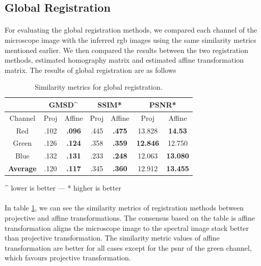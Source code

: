 \documentclass[12pt,oneside]{report}
\begin{document}
\subsection{Global Registration}
\paragraph{}
For evaluating the global registration methods, we compared each channel of the microscope image with the inferred \acrshort{rgb} images using the same similarity metrics mentioned earlier. We then compared the results between the two registration methods, estimated homography matrix and estimated affine transformation matrix. The results of global registration are as follows

\begin{center}
\begin{table}[h]
\centering
\begin{tabular}{ c c c c c c c } 
 & \multicolumn{2}{c}{GMSD\^{}} & \multicolumn{2}{c}{SSIM*} & \multicolumn{2}{c}{PSNR*} \\
\hline
Channel & Proj & Affine & Proj & Affine & Proj & Affine \\
\hline
Red              & .102 & \textbf{.096} & .445 & \textbf{.475} & 13.828          & \textbf{14.53} \\
Green            & .126 & \textbf{.124} & .358 & \textbf{.359} & \textbf{12.846} & 12.750 \\
Blue             & .132 & \textbf{.131} & .233 & \textbf{.248} & 12.063          & \textbf{13.080} \\
\textbf{Average} & .120 & \textbf{.117} & .345 & \textbf{.360} & 12.912          & \textbf{13.455} \\
\hline
\end{tabular}

\vspace{0.2cm}
\^{} lower is better --- * higher is better

\caption{Similarity metrics for global registration.}
\label{table:global-reg}
\end{table}
\end{center}

\paragraph{}
In table \ref{table:global-reg}, we can see the similarity metrics of registration methods between projective and affine transformations. The consensus based on the table is affine transformation aligns the microscope image to the spectral image stack better than projective transformation. The similarity metric values of affine transformation are better for all cases except for the \acrshort{psnr} of the green channel, which favours projective transformation.
\end{document}
